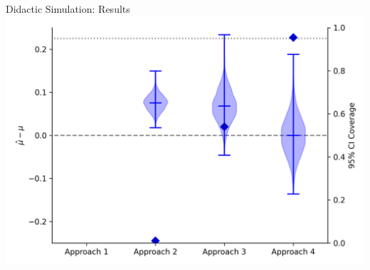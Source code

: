 \documentclass{beamer}
\begin{document}
\begin{frame}{Didactic Simulation: Results}
	\centering		
	\includegraphics[scale=0.55]{code/figure_didactic_results.png}	
\end{frame}
\end{document}
